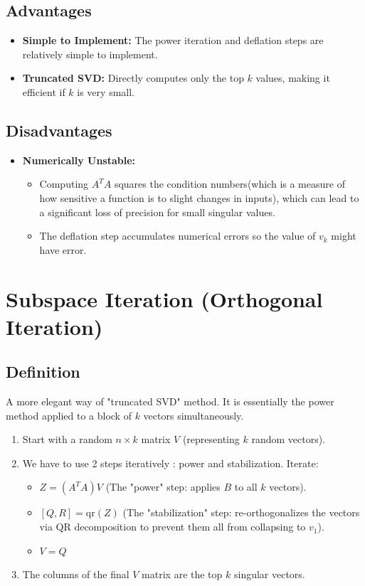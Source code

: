 \documentclass[12pt,a4paper]{article}
\begin{document}
\subsection*{Advantages}
\begin{itemize}
    \item \textbf{Simple to Implement:} The power iteration and deflation steps are relatively simple to implement.
    \item \textbf{Truncated SVD:} Directly computes only the top $k$ values, making it efficient if $k$ is very small.
\end{itemize}

\subsection*{Disadvantages}
\begin{itemize}
    \item \textbf{Numerically Unstable:}
        \begin{itemize}
            \item Computing $A^TA$ squares the condition numbers(which is a measure of how sensitive a function is to slight changes in inputs), which can lead to a significant loss of precision for small singular values.
            \item The deflation step accumulates numerical errors so the value of $v_k$ might have error.
        \end{itemize}
\end{itemize}

\section{Subspace Iteration (Orthogonal Iteration)}

\subsection*{Definition}
A more elegant way of "truncated SVD" method. It is essentially the power method applied to a block of $k$ vectors simultaneously.
\begin{enumerate}
    \item Start with a random $n \times k$ matrix $V$ (representing $k$ random vectors).
    \item We have to use 2 steps iteratively : power and stabilization. 
    Iterate:
        \begin{itemize}
            \item $Z = (A^TA)V$   (The "power" step: applies $B$ to all $k$ vectors).
            \item $[Q, R] = \text{qr}(Z)$     (The "stabilization" step: re-orthogonalizes the vectors via QR decomposition to prevent them all from collapsing to $v_1$).
            \item $V = Q$
        \end{itemize}
    \item The columns of the final $V$ matrix are the top $k$ singular vectors.
\end{enumerate}
\end{document}
